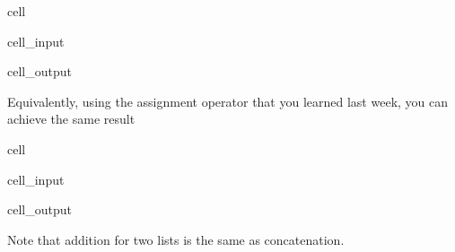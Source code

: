 \documentclass[letterpaper,10pt,english]{jupyterBook}
\begin{document}
\begin{sphinxuseclass}{cell}\begin{sphinxVerbatimInput}

\begin{sphinxuseclass}{cell_input}
\begin{sphinxVerbatim}[commandchars=\\\{\}]
\PYG{p}{[} \PYG{p}{]}
\end{sphinxVerbatim}

\end{sphinxuseclass}\end{sphinxVerbatimInput}
\begin{sphinxVerbatimOutput}

\begin{sphinxuseclass}{cell_output}
\begin{sphinxVerbatim}[commandchars=\\\{\}]
[3, 6, 4, 6, 7, 8]
\end{sphinxVerbatim}

\end{sphinxuseclass}\end{sphinxVerbatimOutput}

\end{sphinxuseclass}
\sphinxAtStartPar
Equivalently, using the assignment operator \sphinxcode{\sphinxupquote{+=}} that you learned last week, you can achieve the same result

\begin{sphinxuseclass}{cell}\begin{sphinxVerbatimInput}

\begin{sphinxuseclass}{cell_input}
\begin{sphinxVerbatim}[commandchars=\\\{\}]
  \PYG{p}{[} \PYG{p}{]}
\end{sphinxVerbatim}

\end{sphinxuseclass}\end{sphinxVerbatimInput}
\begin{sphinxVerbatimOutput}

\begin{sphinxuseclass}{cell_output}
\begin{sphinxVerbatim}[commandchars=\\\{\}]
[3, 6, 4, 6, 7, 8, 9, 10]
\end{sphinxVerbatim}

\end{sphinxuseclass}\end{sphinxVerbatimOutput}

\end{sphinxuseclass}
\sphinxAtStartPar
Note that addition for two lists is the same as concatenation.
\end{document}
